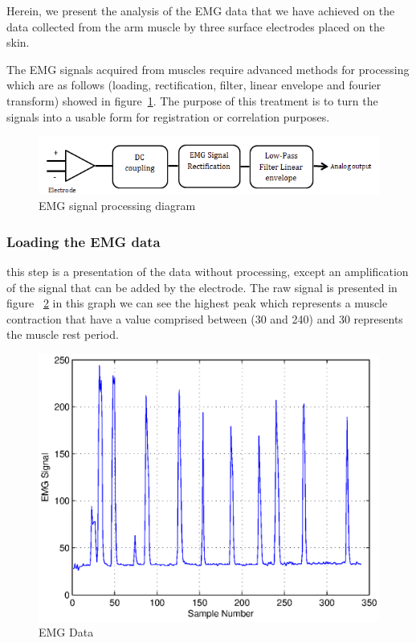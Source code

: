 \documentclass[conference]{IEEEtran}
\begin{document}
Herein, we present the analysis of the EMG data that we have achieved on the data collected from the arm muscle by three surface electrodes placed on the skin.\par
The EMG signals acquired from muscles require advanced methods for processing which are as follows (loading, rectification, filter, linear envelope and fourier transform) showed in figure~\ref{fig:struct}. The purpose of this treatment is to turn the signals into a usable form  for registration or correlation purposes.\par

\begin{figure}[!hb]
    \includegraphics[scale=0.45]{Figures/fig0.png}
    \caption{EMG signal processing diagram}
    \label{fig:struct}
\end{figure}


\subsubsection{Loading the EMG data} \label{sub:LoadingtheEMGdata}\par
this step is a presentation of the data without processing, except an amplification of the signal that can be added by the electrode. The raw signal is presented in figure~ \ref{fig:data} in this graph we can see the highest peak which represents a muscle contraction that have a value comprised between (30 and 240) and 30 represents the muscle rest period.\par

\begin{figure}[!hb]
    \hspace*{1.2 cm}
    \includegraphics[scale=0.40]{Figures/data1.eps}
    \caption{EMG Data}
    \label{fig:data}
\end{figure}
\end{document}
